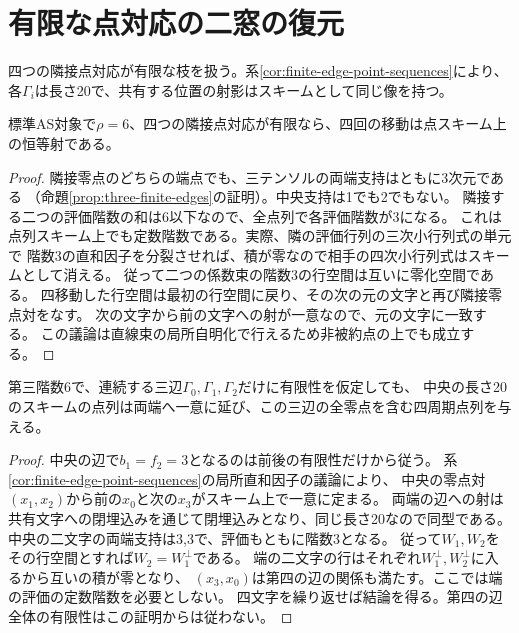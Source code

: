 \section{有限な点対応の二窓の復元}
\label{sec:finite-point-chart}
四つの隣接点対応が有限な枝を扱う。系\ref{cor:finite-edge-point-sequences}により、
各$\Gamma_i$は長さ20で、共有する位置の射影はスキームとして同じ像を持つ。

\begin{proposition}\label{prop:rank-six-finite-four-shift}
標準AS対象で$\rho=6$、四つの隣接点対応が有限なら、四回の移動は点スキーム上の恒等射である。
\end{proposition}
\begin{proof}
隣接零点のどちらの端点でも、三テンソルの両端支持はともに3次元である
（命題\ref{prop:three-finite-edges}の証明）。中央支持は1でも2でもない。
隣接する二つの評価階数の和は6以下なので、全点列で各評価階数が3になる。
これは点列スキーム上でも定数階数である。実際、隣の評価行列の三次小行列式の単元で
階数3の直和因子を分裂させれば、積が零なので相手の四次小行列式はスキームとして消える。
従って二つの係数束の階数3の行空間は互いに零化空間である。
四移動した行空間は最初の行空間に戻り、その次の元の文字と再び隣接零点対をなす。
次の文字から前の文字への射が一意なので、元の文字に一致する。
この議論は直線束の局所自明化で行えるため非被約点の上でも成立する。
\end{proof}

\begin{corollary}[三辺からの周期点列]\label{cor:three-finite-periodic-sequences}
第三階数6で、連続する三辺$\Gamma_0,\Gamma_1,\Gamma_2$だけに有限性を仮定しても、
中央の長さ20のスキームの点列は両端へ一意に延び、この三辺の全零点を含む四周期点列を与える。
\end{corollary}
\begin{proof}
中央の辺で$b_1=f_2=3$となるのは前後の有限性だけから従う。
系\ref{cor:finite-edge-point-sequences}の局所直和因子の議論により、
中央の零点対$(x_1,x_2)$から前の$x_0$と次の$x_3$がスキーム上で一意に定まる。
両端の辺への射は共有文字への閉埋込みを通じて閉埋込みとなり、同じ長さ20なので同型である。
中央の二文字の両端支持は3,3で、評価もともに階数3となる。
従って$W_1,W_2$をその行空間とすれば$W_2=W_1^\perp$である。
端の二文字の行はそれぞれ$W_1^\perp,W_2^\perp$に入るから互いの積が零となり、
$(x_3,x_0)$は第四の辺の関係も満たす。ここでは端の評価の定数階数を必要としない。
四文字を繰り返せば結論を得る。第四の辺全体の有限性はこの証明からは従わない。
\end{proof}

